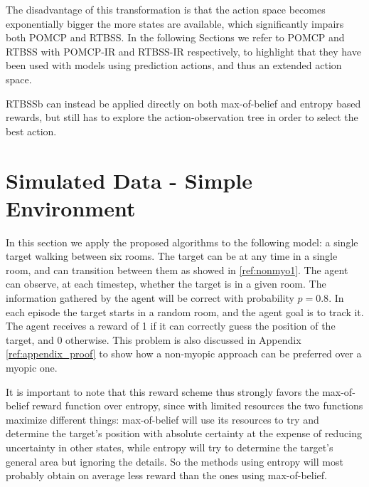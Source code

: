 The disadvantage of this transformation is that the action space becomes exponentially bigger the
more states are available, which significantly impairs both POMCP and RTBSS. In the following Sections we refer to POMCP and RTBSS with POMCP-IR and RTBSS-IR respectively, to highlight that they have been used with models using prediction actions, and thus an extended action space.

RTBSSb can instead be applied directly on both max-of-belief and entropy based rewards, but still
has to explore the action-observation tree in order to select the best action.

\section{Simulated Data - Simple Environment}

In this section we apply the proposed algorithms to the following model: a single target walking
between six rooms. The target can be at any time in a single room, and can transition between them
as showed in \ref{ref:nonmyo1}. The agent can observe, at each timestep, whether the target is in a
given room. The information gathered by the agent will be correct with probability $p=0.8$. In each
episode the target starts in a random room, and the agent goal is to track it. The
agent receives a reward of 1 if it can correctly guess the position of the target, and 0 otherwise.
This problem is also discussed in Appendix \ref{ref:appendix_proof} to show how a non-myopic
approach can be preferred over a myopic one.

It is important to note that this reward scheme thus strongly favors the max-of-belief reward
function over entropy, since with limited resources the two functions maximize different things: max-of-belief will use its
resources to try and determine the target's position with absolute certainty at the expense of reducing uncertainty in other states, while entropy will try to determine the target's general area but ignoring the
details. So the methods using entropy will most probably obtain on average less reward than the ones
using max-of-belief.
%

